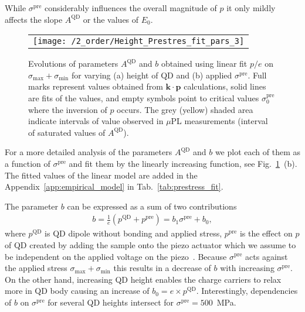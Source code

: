 While $\sigma^{\mathrm{pre}}$ considerably influences the overall magnitude of $p$ it only mildly affects the slope $A^{\mathrm{QD}}$ or the values of $E_0$.
%
%
%

\begin{figure}[!ht]
	\renewcommand{\tabcolsep}{2pt}
	\begin{center}
		\begin{tabular}{c}
			\texttt{[image: /2\_order/Height\_Prestres\_fit\_pars\_3]} \\
		\end{tabular}
	\end{center}
	\caption{Evolutions of parameters $A^{\mathrm{QD}}$ and $b$ obtained using linear fit $p/e$ on $\sigma_{\mathrm{max}}+\sigma_{\mathrm{min}}$ for varying (a) height of QD and (b) applied $\sigma^{\mathrm{pre}}$. Full marks represent values obtained from $\mathbf{k\cdot p}$ calculations, solid lines are fits of the values, and empty symbols point to critical values $\sigma^\mathrm{pre}_\mathrm{0}$ where the inversion of $p$ occurs. The grey (yellow) shaded area indicate intervals of value observed in $\mu$PL measurements (interval of saturated values of $A^{\mathrm{QD}}$). 
		\label{fig:FitHeightPrestress}}
\end{figure}
%
For a more detailed analysis of the parameters $A^{\mathrm{QD}}$ and $b$ we plot each of them as a function of $\sigma^{\mathrm{pre}}$ and fit them by the linearly increasing function, see Fig.~\ref{fig:FitHeightPrestress}~(b). The fitted values of the linear model are added in the Appendix~\ref{app:empirical_model} in Tab.~\ref{tab:prestress_fit}.

The parameter $b$ can be expressed as a sum of two contributions
\begin{eqnarray}
b =\frac{1}{e} \left(p^\mathrm{QD} + p^\mathrm{pre} \right)=b_1\sigma^\mathrm{pre} +b_0,
\end{eqnarray} 
%
%
where $p^\mathrm{QD}$ is QD dipole without bonding and applied stress, $p^\mathrm{pre}$ is the effect on $p$ of QD created by adding the sample onto the piezo actuator which we assume to be independent on the applied voltage on the piezo~\cite{Aberl:17}. Because $\sigma^{\mathrm{pre}}$ acts against the applied stress $\sigma_{\mathrm{max}}+\sigma_{\mathrm{min}}$ this results in a decrease of $b$ with increasing $\sigma^\mathrm{pre}$. On the other hand, increasing QD height enables the charge carriers to relax more in QD body causing an increase of $b_0=e\times p^\mathrm{QD}$. Interestingly, dependencies of $b$ on $\sigma^\mathrm{pre}$ for several QD heights intersect for $\sigma^\mathrm{pre}=500$~MPa.

